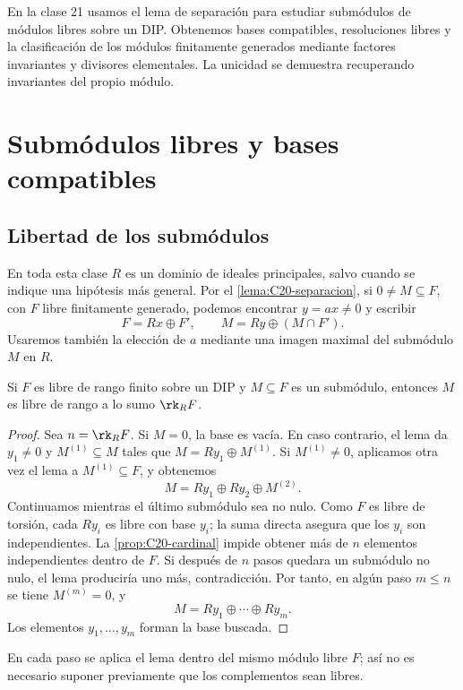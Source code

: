 En la clase 21 usamos el lema de separación para estudiar submódulos de módulos libres sobre un DIP. Obtenemos bases compatibles, resoluciones libres y la clasificación de los módulos finitamente generados mediante factores invariantes y divisores elementales. La unicidad se demuestra recuperando invariantes del propio módulo.

\section{Submódulos libres y bases compatibles}
\subsection{Libertad de los submódulos}
En toda esta clase $R$ es un dominio de ideales principales, salvo cuando se indique una hipótesis más general. Por el \cref{lema:C20-separacion}, si $0\ne M\subseteq F$, con $F$ libre finitamente generado, podemos encontrar $y=ax\ne0$ y escribir
\[
F=Rx\oplus F',\qquad M=Ry\oplus(M\cap F').
\]
Usaremos también la elección de $a$ mediante una imagen maximal del submódulo $M$ en $R$.

\begin{prop}\label{prop:C21-submodulo-libre}
Si $F$ es libre de rango finito sobre un DIP y $M\subseteq F$ es un submódulo, entonces $M$ es libre de rango a lo sumo $\rk_R F$.
\end{prop}
\begin{proof}
Sea $n=\rk_R F$. Si $M=0$, la base es vacía. En caso contrario, el lema da $y_1\ne0$ y $M^{(1)}\subseteq M$ tales que $M=Ry_1\oplus M^{(1)}$. Si $M^{(1)}\ne0$, aplicamos otra vez el lema a $M^{(1)}\subseteq F$, y obtenemos
\[
M=Ry_1\oplus Ry_2\oplus M^{(2)}.
\]
Continuamos mientras el último submódulo sea no nulo. Como $F$ es libre de torsión, cada $Ry_i$ es libre con base $y_i$; la suma directa asegura que los $y_i$ son independientes. La \cref{prop:C20-cardinal} impide obtener más de $n$ elementos independientes dentro de $F$. Si después de $n$ pasos quedara un submódulo no nulo, el lema produciría uno más, contradicción. Por tanto, en algún paso $m\leq n$ se tiene $M^{(m)}=0$, y
\[
M=Ry_1\oplus\cdots\oplus Ry_m.
\]
Los elementos $y_1,\ldots,y_m$ forman la base buscada.
\end{proof}
En cada paso se aplica el lema dentro del mismo módulo libre $F$; así no es necesario suponer previamente que los complementos sean libres.

